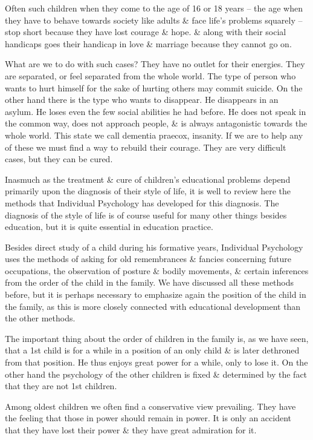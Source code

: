 \documentclass{article}
\begin{document}
Often such children when they come to the age of 16 or 18 years -- the age when they have to behave towards society like adults \& face life's problems squarely -- stop short because they have lost courage \& hope. \& along with their social handicaps goes their handicap in love \& marriage because they cannot go on.

What are we to do with such cases? They have no outlet for their energies. They are separated, or feel separated from the whole world. The type of person who wants to hurt himself for the sake of hurting others may commit suicide. On the other hand there is the type who wants to disappear. He disappears in an asylum. He loses even the few social abilities he had before. He does not speak in the common way, does not approach people, \& is always antagonistic towards the whole world. This state we call dementia praecox, insanity. If we are to help any of these we must find a way to rebuild their courage. They are very difficult cases, but they can be cured.

Inasmuch as the treatment \& cure of children's educational problems depend primarily upon the diagnosis of their style of life, it is well to review here the methods that Individual Psychology has developed for this diagnosis. The diagnosis of the style of life is of course useful for many other things besides education, but it is quite essential in education practice.

Besides direct study of a child during his formative years, Individual Psychology uses the methods of asking for old remembrances \& fancies concerning future occupations, the observation of posture \& bodily movements, \& certain inferences from the order of the child in the family. We have discussed all these methods before, but it is perhaps necessary to emphasize again the position of the child in the family, as this is more closely connected with educational development than the other methods.

The important thing about the order of children in the family is, as we have seen, that a 1st child is for a while in a position of an only child \& is later dethroned from that position. He thus enjoys great power for a while, only to lose it. On the other hand the psychology of the other children is fixed \& determined by the fact that they are not 1st children.

Among oldest children we often find a conservative view prevailing. They have the feeling that those in power should remain in power. It is only an accident that they have lost their power \& they have great admiration for it.
\end{document}
